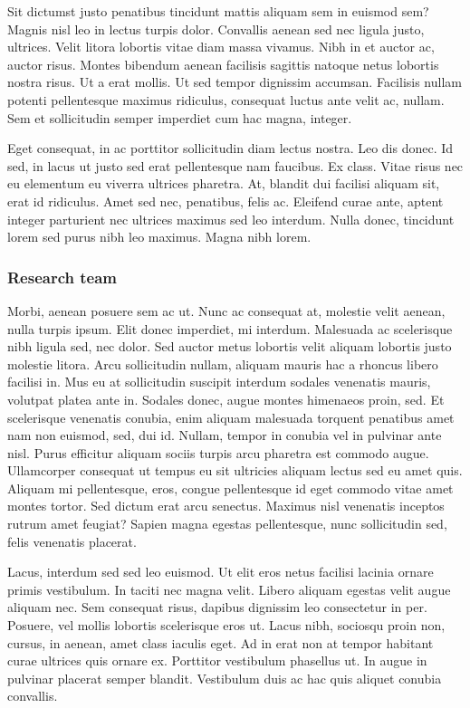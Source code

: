 \documentclass[
  11pt,
  letterpaper,
  DIV=11,
  numbers=noendperiod]{scrartcl}
\begin{document}
Sit dictumst justo penatibus tincidunt mattis aliquam sem in euismod
sem? Magnis nisl leo in lectus turpis dolor. Convallis aenean sed nec
ligula justo, ultrices. Velit litora lobortis vitae diam massa vivamus.
Nibh in et auctor ac, auctor risus. Montes bibendum aenean facilisis
sagittis natoque netus lobortis nostra risus. Ut a erat mollis. Ut sed
tempor dignissim accumsan. Facilisis nullam potenti pellentesque maximus
ridiculus, consequat luctus ante velit ac, nullam. Sem et sollicitudin
semper imperdiet cum hac magna, integer.

Eget consequat, in ac porttitor sollicitudin diam lectus nostra. Leo dis
donec. Id sed, in lacus ut justo sed erat pellentesque nam faucibus. Ex
class. Vitae risus nec eu elementum eu viverra ultrices pharetra. At,
blandit dui facilisi aliquam sit, erat id ridiculus. Amet sed nec,
penatibus, felis ac. Eleifend curae ante, aptent integer parturient nec
ultrices maximus sed leo interdum. Nulla donec, tincidunt lorem sed
purus nibh leo maximus. Magna nibh lorem.

\hypertarget{research-team}{%
\subsubsection{Research team}\label{research-team}}

Morbi, aenean posuere sem ac ut. Nunc ac consequat at, molestie velit
aenean, nulla turpis ipsum. Elit donec imperdiet, mi interdum. Malesuada
ac scelerisque nibh ligula sed, nec dolor. Sed auctor metus lobortis
velit aliquam lobortis justo molestie litora. Arcu sollicitudin nullam,
aliquam mauris hac a rhoncus libero facilisi in. Mus eu at sollicitudin
suscipit interdum sodales venenatis mauris, volutpat platea ante in.
Sodales donec, augue montes himenaeos proin, sed. Et scelerisque
venenatis conubia, enim aliquam malesuada torquent penatibus amet nam
non euismod, sed, dui id. Nullam, tempor in conubia vel in pulvinar ante
nisl. Purus efficitur aliquam sociis turpis arcu pharetra est commodo
augue. Ullamcorper consequat ut tempus eu sit ultricies aliquam lectus
sed eu amet quis. Aliquam mi pellentesque, eros, congue pellentesque id
eget commodo vitae amet montes tortor. Sed dictum erat arcu senectus.
Maximus nisl venenatis inceptos rutrum amet feugiat? Sapien magna
egestas pellentesque, nunc sollicitudin sed, felis venenatis placerat.

Lacus, interdum sed sed leo euismod. Ut elit eros netus facilisi lacinia
ornare primis vestibulum. In taciti nec magna velit. Libero aliquam
egestas velit augue aliquam nec. Sem consequat risus, dapibus dignissim
leo consectetur in per. Posuere, vel mollis lobortis scelerisque eros
ut. Lacus nibh, sociosqu proin non, cursus, in aenean, amet class
iaculis eget. Ad in erat non at tempor habitant curae ultrices quis
ornare ex. Porttitor vestibulum phasellus ut. In augue in pulvinar
placerat semper blandit. Vestibulum duis ac hac quis aliquet conubia
convallis.
\end{document}
